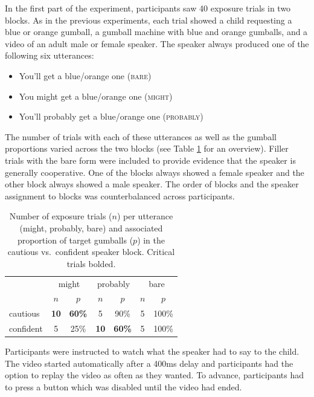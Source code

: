  In the first part of the experiment, participants saw 40 exposure trials in two blocks. As in the previous experiments,  each trial showed a child requesting a blue or orange gumball, a gumball machine with blue and orange gumballs, and a video of an adult male or female speaker. The speaker always produced one of the following six utterances:%
 
\begin{itemize}
\item You'll get a blue/orange one (\textsc{bare})
\item You might get a blue/orange one (\textsc{might})
\item You'll probably get a blue/orange one (\textsc{probably})
\end{itemize}


The number of trials with each of these utterances as well as the gumball proportions varied across the two blocks (see Table \ref{tab:materials} for an overview). Filler trials with the bare form were included to provide evidence that the speaker is generally cooperative. One of the blocks always showed a female speaker and the other block always showed a male speaker. The order of blocks and the speaker assignment to blocks was counterbalanced across participants. 

\begin{table}
\centering
\begin{tabular}{l c c c c c c}
\toprule
& \multicolumn{2}{c}{\sc might} & \multicolumn{2}{c}{\sc probably} & \multicolumn{2}{c}{\sc bare}\\
& $n$ & $p$ & $n$ & $p$ & $n$ & $p$\\
\midrule
cautious & {\bf 10} & {\bf 60\%} & 5 & 90\% & 5 & 100\%\\
confident & 5 & 25\% & {\bf 10}  & {\bf 60\%} & 5  & 100\%\\  
\bottomrule
\end{tabular}
\caption{Number of exposure trials ($n$) per utterance ({\sc might}, {\sc probably}, {\sc bare}) and associated proportion of target gumballs ($p$) in the cautious vs.~confident speaker block. Critical trials bolded. \label{tab:materials}}

\end{table}

Participants were instructed to watch what the speaker had to say to the child. The video started automatically after a 400ms delay and participants had the option to replay the video as often as they wanted. To advance, participants had to press a button which was disabled until the video had ended.

